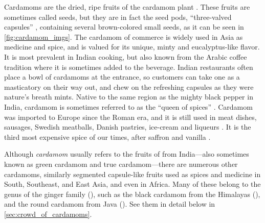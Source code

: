 Cardamoms are the dried, ripe fruits of the cardamom plant . These fruits are sometimes called seeds, but they are in fact the seed pods, ``three-valved capsules'' \autocite[132]{van_wyk_culinary_2014}, containing several brown-colored small seeds, as it can be seen in \cref{fig:cardamom_imgs}. The cardamom of commerce is widely used in Asia as medicine and spice, and is valued for its unique, minty and eucalyptus-like flavor. It is most prevalent in Indian cooking, but also known from the Arabic coffee tradition where it is sometimes added to the beverage. Indian restaurants often place a bowl of cardamoms at the entrance, so customers can take one as a masticatory on their way out, and chew on the refreshing capsules as they were nature's breath mints. Native to the same region as the mighty black pepper in India, cardamom is sometimes referred to as the ``queen of spices'' \autocite[1]{ravindran_cardamom_2002}. Cardamom was imported to Europe since the Roman era, and it is still used in meat dishes, sausages, Swedish meatballs, Danish pastries, ice-cream and liqueurs \autocite[326]{mabberley_mabberleys_2017}. It is the third most expensive spice of our times, after saffron and vanilla \autocite{business_insider_why_2021}.

Although \textit{cardamom} usually refers to the fruits of  from India---also sometimes known as green cardamom and true cardamom---there are numerous other cardamoms, similarly segmented capsule-like fruits used as spices and medicine in South, Southeast, and East Asia, and even in Africa. Many of these belong to the  genus of the ginger family (), such as the black cardamom from the Himalayas (), and the round cardamom from Java (). See them in detail below in \cref{sec:crowd_of_cardamoms}.




